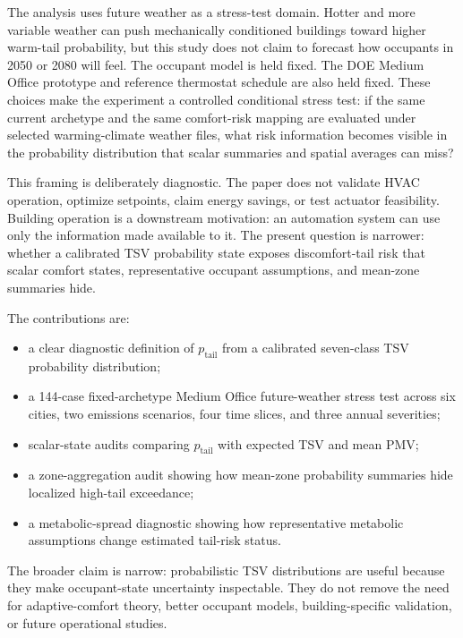 The analysis uses future weather as a stress-test domain. Hotter and more variable weather can push mechanically conditioned buildings toward higher warm-tail probability, but this study does not claim to forecast how occupants in 2050 or 2080 will feel. The occupant model is held fixed. The DOE Medium Office prototype and reference thermostat schedule are also held fixed. These choices make the experiment a controlled conditional stress test: if the same current archetype and the same comfort-risk mapping are evaluated under selected warming-climate weather files, what risk information becomes visible in the probability distribution that scalar summaries and spatial averages can miss?

This framing is deliberately diagnostic. The paper does not validate HVAC operation, optimize setpoints, claim energy savings, or test actuator feasibility. Building operation is a downstream motivation: an automation system can use only the information made available to it. The present question is narrower: whether a calibrated TSV probability state exposes discomfort-tail risk that scalar comfort states, representative occupant assumptions, and mean-zone summaries hide.

The contributions are:
\begin{itemize}
    \item a clear diagnostic definition of $p_{\mathrm{tail}}$ from a calibrated seven-class TSV probability distribution;
    \item a 144-case fixed-archetype Medium Office future-weather stress test across six cities, two emissions scenarios, four time slices, and three annual severities;
    \item scalar-state audits comparing $p_{\mathrm{tail}}$ with expected TSV and mean PMV;
    \item a zone-aggregation audit showing how mean-zone probability summaries hide localized high-tail exceedance;
    \item a metabolic-spread diagnostic showing how representative metabolic assumptions change estimated tail-risk status.
\end{itemize}

The broader claim is narrow: probabilistic TSV distributions are useful because they make occupant-state uncertainty inspectable. They do not remove the need for adaptive-comfort theory, better occupant models, building-specific validation, or future operational studies.
